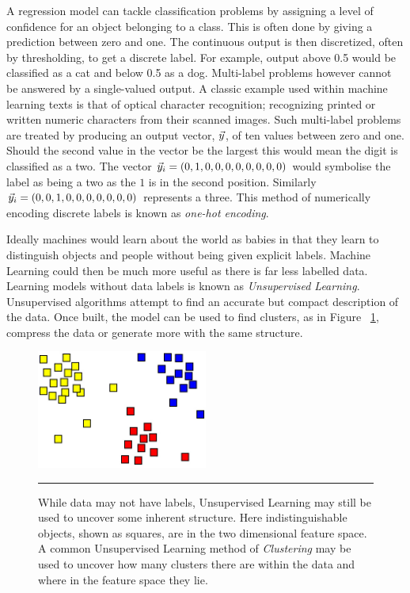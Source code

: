 A regression model can tackle classification problems by assigning a level of confidence for an object belonging to a class.
This is often done by giving a prediction between zero and one.
The continuous output is then discretized, often by thresholding, to get a discrete label.
For example, output above 0.5 would be classified as a cat and below 0.5 as a dog.
Multi-label problems however cannot be answered by a single-valued output.
A classic example used within machine learning texts\citep{lecun2007mnist} is that of optical character recognition; recognizing printed or written numeric characters from their scanned images.
Such multi-label problems are treated by producing an output vector, $\vo{y}$, of ten values between zero and one.
Should the second value in the vector be the largest this would mean the digit is classified as a two.
The vector $\vo{y}_i = (0, 1, 0, 0 , 0, 0, 0, 0, 0, 0)$ would symbolise the label as being a two as the $1$ is in the second position.
Similarly $\vo{y}_i = (0, 0, 1, 0, 0, 0, 0, 0, 0, 0)$ represents a three.
This method of numerically encoding discrete labels is known as \textit{one-hot encoding}.

Ideally machines would learn about the world as babies in that they learn to distinguish objects and people without being given explicit labels.
Machine Learning could then be much more useful as there is far less labelled data.
Learning models without data labels is known as \textit{Unsupervised Learning}.
Unsupervised algorithms attempt to find an accurate but compact description of the data\citep{barber2012bayesian}.
Once built, the model can be used to find clusters, as in Figure ~\ref{fig:Clustering}, compress the data or generate more with the same structure.
\begin{figure}[htbp]
	\centering
		\includegraphics[width = 0.5\textwidth]{./Figures/clustering.jpg}
		\rule{35em}{0.5pt}
	\caption[Clustering]{While data may not have labels, Unsupervised Learning may still be used to uncover some inherent structure. Here indistinguishable objects, shown as squares, are in the two dimensional feature space. A common Unsupervised Learning method of \textit{Clustering} may be used to uncover how many clusters there are within the data and where in the feature space they lie.}
		\label{fig:Clustering}
\end{figure}

